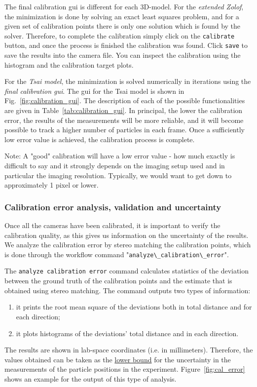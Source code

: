 \documentclass[10pt,a4paper]{article}
\begin{document}
The final calibration gui is different for each 3D-model.
For the \textit{extended Zolof}, the minimization is done by solving an exact least squares problem, and for a given set of calibration points there is only one solution which is found by the solver. Therefore, to complete the calibration simply click on the \texttt{calibrate} button, and once the process is finished the calibration was found. Click \texttt{save} to save the results into the camera file. You can inspect the calibration using the histogram and the calibration target plots. 


For the \textit{Tsai model}, the minimization is solved numerically in iterations using the \textit{final calibration gui}. 
The gui for the Tsai model is shown in Fig.~\ref{fig:calibration_gui}. The description of each of the possible functionalities are given in Table~\ref{tab:calibration_gui}. In principal, the lower the calibration error, the results of the measurements will be more reliable, and it will become possible to track a higher number of particles in each frame. Once a sufficiently low error value is achieved, the calibration process is complete. 



Note: A "good" calibration will have a low error value - how much exactly is difficult to say and it strongly depends on the imaging setup used and in particular the imaging resolution. Typically, we would want to get down to approximately 1 pixel or lower.  





\subsubsection{Calibration error analysis, validation and uncertainty}

	
Once all the cameras have been calibrated, it is important to verify the calibration quality, as this gives us information on the uncertainty of the results. We analyze the calibration error by stereo matching the calibration points, which is done through the workflow command "\verb!analyze\_calibration\_error!". 

The \texttt{analyze calibration error} command calculates statistics of the deviation between the ground truth of the calibration points and the estimate that is obtained using stereo matching. The command outputs two types of information: 
\begin{enumerate}
	\item it prints the root mean square of the deviations both in total distance and for each direction;
	
	\item it plots histograms of the deviations' total distance and in each direction.
\end{enumerate}
%
The results are shown in lab-space coordinates (i.e. in millimeters). Therefore, the values obtained can be taken as the \underline{lower bound} for the uncertainty in the measurements of the particle positions in the experiment. Figure~\ref{fig:cal_error} shows an example for the output of this type of analysis. 
\end{document}
